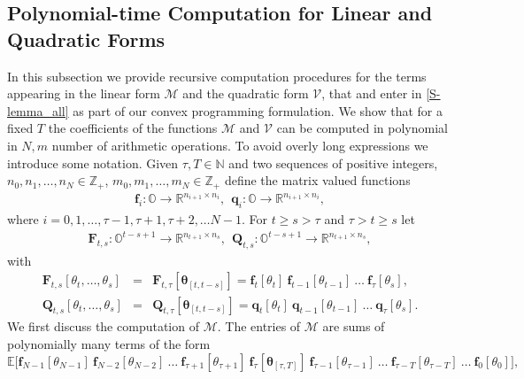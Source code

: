 \documentclass[letterpaper,11pt]{article}
\begin{document}
\subsection{Polynomial-time Computation for Linear and Quadratic Forms }
\label{sec:52}
In this subsection we  provide recursive computation procedures  for the terms appearing in the linear
form $ \mathcal{M}$ and the quadratic form 
$  \mathcal{V}$,  that and enter in \eqref{S-lemma_all}
as part of  our convex programming formulation.
We show that for a fixed $T$
the coefficients of the functions $\mathcal{M}$  and $\mathcal{V}$ 
can be computed in polynomial in  $N, m$  number  of arithmetic operations.
To avoid overly long expressions we  introduce some notation.
Given $ \tau, T \in \mathbb{N}$ and two sequences of positive integers, $ n_0, n_1, \hdots, n_N \in \mathbb{Z}_+$,
$ m_0, m_1, \hdots, m_N \in \mathbb{Z}_+$ define the matrix valued functions
\begin{eqnarray*}
	\mathbf{f}_i  :  \mathbb{O} \rightarrow \mathbb{R}^{n_{i+1} \times n_i}, ~~
	\mathbf{q}_i  :  \mathbb{O} \rightarrow \mathbb{R}^{n_{i+1} \times n_i}, 
\end{eqnarray*}
where $i = 0, 1, \hdots, \tau-1, \tau+1, \tau+2, 
\hdots N-1$. For $ t \geq s > \tau$ and $ \tau > t \geq s$ let 
\begin{eqnarray*}
	\mathbf{F}_{t,s}  :  \mathbb{O}^{t-s+1} \rightarrow \mathbb{R}^{n_{t+1} \times n_s}, ~~
	\mathbf{Q}_{t,s}  :  \mathbb{O}^{t-s+1} \rightarrow \mathbb{R}^{n_{t+1} \times n_s}, 
\end{eqnarray*}
with 
\begin{eqnarray*}
	\mathbf{F}_{t,s}[\theta_{t}, \hdots, \theta_{s}] & = & \mathbf{F}_{t, \tau}[\bm{\theta}_{[t,t-s]}]
	= \mathbf{f}_{t}[\theta_{t}] ~\mathbf{f}_{t-1}[\theta_{t-1}] ~ \hdots ~ \mathbf{f}_{\tau}[\theta_{s}], \\
	\mathbf{Q}_{t,s}[\theta_{t}, \hdots, \theta_{s}] & = & \mathbf{Q}_{t, \tau}[\bm{\theta}_{[t,t-s]}]
	= \mathbf{q}_{t}[\theta_{t}] ~\mathbf{q}_{t-1}[\theta_{t-1}] ~ \hdots ~ \mathbf{q}_{\tau}[\theta_{s}].
\end{eqnarray*}
We first discuss the computation of $\mathcal{M} $.
The entries of $\mathcal{M} $ are sums of polynomially many terms of the form 
\begin{equation}
\label{linear_term}
\mathbb{E}\bigg[\mathbf{f}_{N-1}[\theta_{N-1}] ~\mathbf{f}_{N-2}[\theta_{N-2}] ~ \hdots ~ \mathbf{f}_{\tau+1}[\theta_{\tau+1}] ~ \mathbf{f}_{\tau}[\bm{\theta}_{[\tau,T]}] ~ 
\mathbf{f}_{\tau-1}[\theta_{\tau-1}]  ~ \hdots ~ \mathbf{f}_{\tau-T}[\theta_{\tau-T}]   ~ \hdots ~
\mathbf{f}_0[\theta_0]\bigg],
\end{equation}
\end{document}
